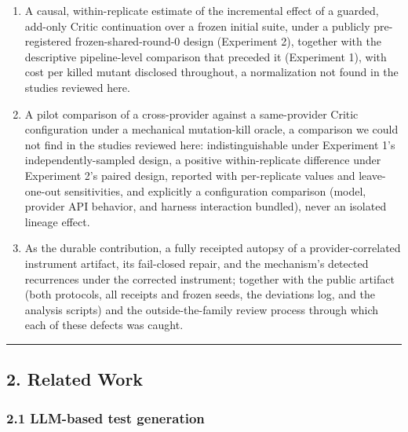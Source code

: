 \documentclass[
  11pt,
]{article}
\providecommand{\tightlist}{%
  \setlength{\itemsep}{0pt}\setlength{\parskip}{0pt}}
\begin{document}
\begin{enumerate}
\def\labelenumi{\arabic{enumi}.}
\tightlist
\item
  A causal, within-replicate estimate of the incremental effect of a
  guarded, add-only Critic continuation over a frozen initial suite,
  under a publicly pre-registered frozen-shared-round-0 design
  (Experiment 2), together with the descriptive pipeline-level
  comparison that preceded it (Experiment 1), with cost per killed
  mutant disclosed throughout, a normalization not found in the studies
  reviewed here.
\item
  A pilot comparison of a cross-provider against a same-provider Critic
  configuration under a mechanical mutation-kill oracle, a comparison we
  could not find in the studies reviewed here: indistinguishable under
  Experiment 1's independently-sampled design, a positive
  within-replicate difference under Experiment 2's paired design,
  reported with per-replicate values and leave-one-out sensitivities,
  and explicitly a configuration comparison (model, provider API
  behavior, and harness interaction bundled), never an isolated lineage
  effect.
\item
  As the durable contribution, a fully receipted autopsy of a
  provider-correlated instrument artifact, its fail-closed repair, and
  the mechanism's detected recurrences under the corrected instrument;
  together with the public artifact (both protocols, all receipts and
  frozen seeds, the deviations log, and the analysis scripts) and the
  outside-the-family review process through which each of these defects
  was caught.
\end{enumerate}

\begin{center}\rule{0.5\linewidth}{0.5pt}\end{center}

\subsection{2. Related Work}\label{related-work}

\subsubsection{2.1 LLM-based test
generation}\label{llm-based-test-generation}
\end{document}
